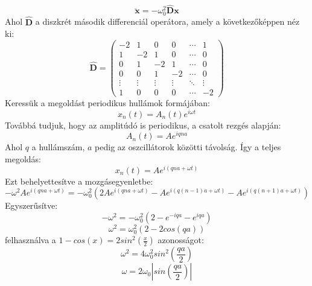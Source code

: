 \documentclass[../main.tex]{subfiles}
\begin{document}
\begin{equation}
    \ddot{\mathbf{x}} = -\omega_0^2 \mathbf{\hat{D}x}
\end{equation}
Ahol $\mathbf{\hat{D}}$ a diszkrét második differenciál operátora, amely a következőképpen néz ki:
\begin{equation}
    \mathbf{\hat{D}} = \begin{pmatrix}
    - 2 & 1 & 0 & 0 & \cdots & 1 \\
    1 & -2 & 1 & 0 & \cdots & 0 \\
    0 & 1 & -2 & 1 & \cdots & 0 \\
    0 & 0 & 1 & -2 & \cdots & 0 \\
    \vdots & \vdots & \vdots & \vdots & \ddots & \vdots \\
    1 & 0 & 0 & 0 & \cdots & -2
    \end{pmatrix}
\end{equation}
Keressük a megoldást periodikus hullámok formájában:
\begin{equation}
    x_n(t) = A_n(t) e^{i\omega t}
\end{equation}
Továbbá tudjuk, hogy az amplitúdó is periodikus, a csatolt rezgés alapján:
\begin{equation}
    A_n(t) = A e^{i q n a}
\end{equation}
Ahol $q$ a hullámszám, $a$ pedig az oszcillátorok közötti távolság. Így a teljes megoldás:
\begin{equation}
    x_n(t) = A e^{i (q n a + \omega t)}
\end{equation}
Ezt behelyettesítve a mozgásegyenletbe:
\begin{equation}
    -\omega^2 A e^{i (q n a + \omega t)} = -\omega_0^2 \left( 2A e^{i (q n a + \omega t)} - A e^{i (q (n-1) a + \omega t)} - A e^{i (q (n+1) a + \omega t)} \right)
\end{equation}
Egyszerűsítve:
\begin{equation}
    -\omega^2 = -\omega_0^2 \left( 2 - e^{-i q a} - e^{i q a} \right)
\end{equation}
\begin{equation}
    \omega^2 = \omega_0^2 \left( 2 - 2 cos(q a) \right)
\end{equation}
felhasználva a $1 - cos(x) = 2 sin^2\left(\frac{x}{2}\right)$ azonosságot:
\begin{equation}
    \omega^2 = 4 \omega_0^2 sin^2\left(\frac{q a}{2}\right)
\end{equation}
\begin{equation}
    \omega = 2 \omega_0 \left| sin\left(\frac{q a}{2}\right) \right|
\end{equation}
\end{document}
